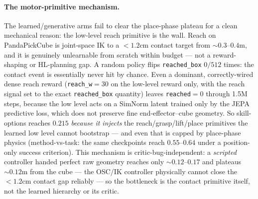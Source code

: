 \documentclass{article}
\begin{document}
\paragraph{The motor-primitive mechanism.}
The learned/generative arms fail to clear the place-phase plateau for a clean
mechanical reason: the low-level reach primitive is the wall. Reach on
PandaPickCube is joint-space IK to a $<\!1.2$cm contact target from ${\sim}0.3$--$0.4$m,
and it is genuinely unlearnable from scratch within budget --- not a
reward-shaping or HL-planning gap. A random policy flips \texttt{reached\_box}
$0/512$ times: the contact event is essentially never hit by chance. Even a
dominant, correctly-wired dense reach reward (\texttt{reach\_w}$=30$ on the
low-level reward only, with the reach signal set to the exact \texttt{reached\_box}
quantity) leaves \texttt{reached}$=0$ through 1.5M steps, because the low level
acts on a SimNorm latent trained only by the JEPA predictive loss, which does not
preserve fine end-effector--cube geometry. So skill-options reaches $0.215$
\emph{because it injects} the reach/grasp/lift/place primitives the learned low
level cannot bootstrap --- and even that is capped by place-phase physics
(method-vs-task: the same checkpoints reach $0.55$--$0.64$ under a position-only
success criterion). This mechanism is critic-bug-independent: a \emph{scripted}
controller handed perfect raw geometry reaches only ${\sim}0.12$--$0.17$ and
plateaus ${\sim}0.12$m from the cube --- the OSC/IK controller physically cannot
close the $<\!1.2$cm contact gap reliably --- so the bottleneck is the contact
primitive itself, not the learned hierarchy or its critic.
\end{document}
